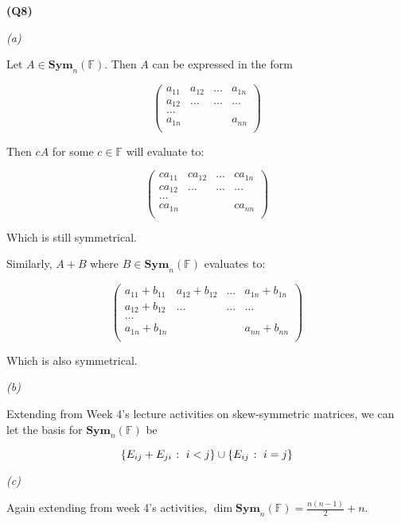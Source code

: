 \documentclass[12pt, a4paper]{article}
\newcommand{\F}{\mathbb{F}}
\begin{document}
\textbf{(Q8)}

\textit{(a)}

Let $A \in \mathbf{Sym}_n(\F)$. Then $A$ can be expressed in the form

\[
    \begin{pmatrix}
        a_{11} & a_{12} & \ldots & a_{1n}\\
        a_{12} & \ldots & \ldots & \ldots\\
        \ldots &        &        & \\
        a_{1n} &        &        & a_{nn}\\
    \end{pmatrix}
\]

Then $cA$ for some $c \in \F$ will evaluate to:

\[
    \begin{pmatrix}
        ca_{11} & ca_{12} & \ldots & ca_{1n}\\
        ca_{12} & \ldots & \ldots & \ldots\\
        \ldots &        &        & \\
        ca_{1n} &        &        & ca_{nn}\\
    \end{pmatrix}
\]

Which is still symmetrical.

Similarly, $A + B$ where $B \in \mathbf{Sym}_n(\F)$ evaluates to:

\[
    \begin{pmatrix}
        a_{11} + b_{11} & a_{12} + b_{12} & \ldots & a_{1n} + b_{1n}\\
        a_{12} + b_{12} & \ldots & \ldots & \ldots\\
        \ldots &        &        & \\
        a_{1n} + b_{1n} &        &        & a_{nn} + b_{nn}\\
    \end{pmatrix}
\]

Which is also symmetrical.

\textit{(b)}

Extending from Week 4's lecture activities on skew-symmetric matrices,
we can let the basis for $\mathbf{Sym}_n(\F)$ be

\[
    \left\{E_{ij} + E_{ji} \; \colon \; i < j \right\} 
    \cup \left\{E_{ij} \; \colon \; i = j\right\}
\]

\textit{(c)}

Again extending from week 4's activities, $\dim \mathbf{Sym}_n(\F) = \frac{n(n - 1)}{2} + n$.
\end{document}
